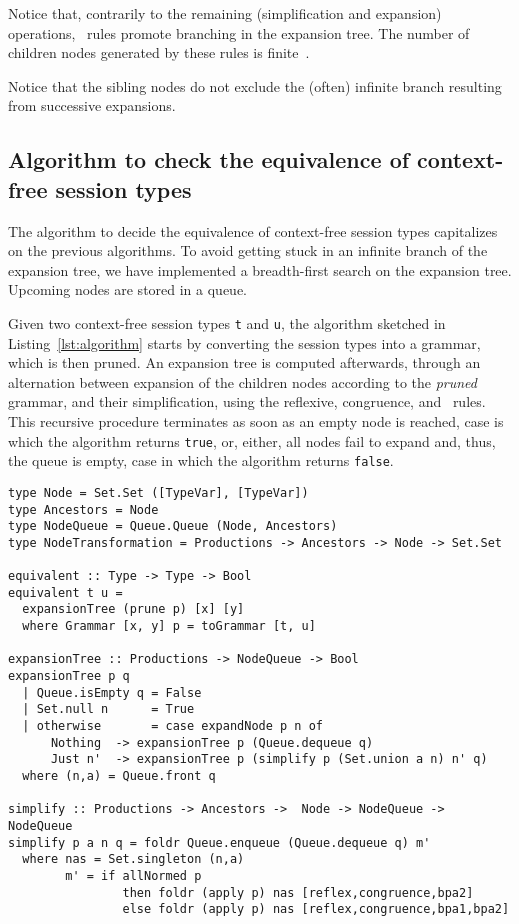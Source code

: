 Notice that, contrarily to the remaining (simplification and expansion) operations,
\BPA\ rules promote branching in the expansion tree. The number of children nodes
generated by these rules is finite~\cite{DBLP:journals/iandc/ChristensenHS95}.

Notice that the sibling nodes do not exclude the (often) infinite branch
resulting from successive expansions.

\subsection{Algorithm to check the equivalence of context-free session types}

The algorithm to decide the equivalence of context-free session
types capitalizes on the previous algorithms. To avoid getting stuck in an
infinite branch of the expansion tree, we have implemented
a breadth-first search on the expansion tree. Upcoming nodes are stored
in a queue.

Given two context-free session types \lstinline|t| and \lstinline|u|,
the algorithm sketched in Listing~\ref{lst:algorithm} starts by converting
the session types into a grammar, which is then pruned. An expansion tree is
computed afterwards, through an alternation between expansion of the children
nodes according to the \emph{pruned} grammar, and their simplification,
using the reflexive, congruence, and \BPA\ rules. This recursive procedure
terminates as soon as an empty node is reached, case is which the
algorithm returns \lstinline|true|, or, either, all nodes fail to expand
and, thus, the queue is empty, case in which the algorithm returns
\lstinline|false|.

\begin{lstlisting}[caption={Algorithm to check the equivalence of context-free session types. Haskell code.},label={lst:algorithm},captionpos=b]
type Node = Set.Set ([TypeVar], [TypeVar])
type Ancestors = Node
type NodeQueue = Queue.Queue (Node, Ancestors)
type NodeTransformation = Productions -> Ancestors -> Node -> Set.Set

equivalent :: Type -> Type -> Bool
equivalent t u =
  expansionTree (prune p) [x] [y]
  where Grammar [x, y] p = toGrammar [t, u]

expansionTree :: Productions -> NodeQueue -> Bool
expansionTree p q
  | Queue.isEmpty q = False
  | Set.null n      = True
  | otherwise       = case expandNode p n of
      Nothing  -> expansionTree p (Queue.dequeue q)
      Just n'  -> expansionTree p (simplify p (Set.union a n) n' q)
  where (n,a) = Queue.front q

simplify :: Productions -> Ancestors ->  Node -> NodeQueue -> NodeQueue
simplify p a n q = foldr Queue.enqueue (Queue.dequeue q) m'
  where nas = Set.singleton (n,a)
        m' = if allNormed p
                then foldr (apply p) nas [reflex,congruence,bpa2]
                else foldr (apply p) nas [reflex,congruence,bpa1,bpa2]
\end{lstlisting}

